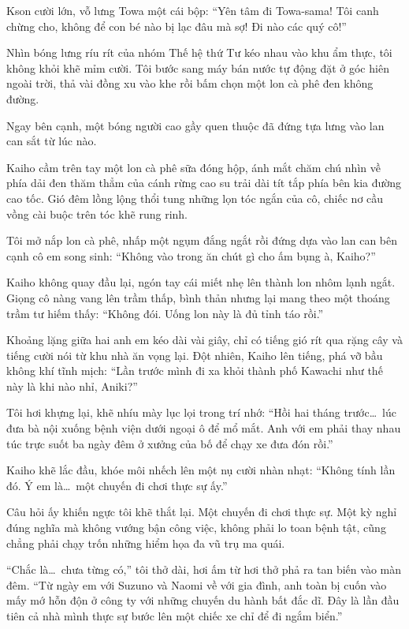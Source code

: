 \documentclass[../main.tex]{subfiles}
\begin{document}
Kson cười lớn, vỗ lưng Towa một cái bộp: ``Yên tâm đi Towa-sama! Tôi canh chừng cho, không để con bé nào bị lạc đâu mà sợ! Đi nào các quý cô!''

Nhìn bóng lưng ríu rít của nhóm Thế hệ thứ Tư kéo nhau vào khu ẩm thực, tôi không khỏi khẽ mỉm cười. Tôi bước sang máy bán nước tự động đặt ở góc hiên ngoài trời, thả vài đồng xu vào khe rồi bấm chọn một lon cà phê đen không đường.

Ngay bên cạnh, một bóng người cao gầy quen thuộc đã đứng tựa lưng vào lan can sắt từ lúc nào.

Kaiho cầm trên tay một lon cà phê sữa đóng hộp, ánh mắt chăm chú nhìn về phía dải đen thăm thẳm của cánh rừng cao su trải dài tít tắp phía bên kia đường cao tốc. Gió đêm lồng lộng thổi tung những lọn tóc ngắn của cô, chiếc nơ cầu vồng cài buộc trên tóc khẽ rung rinh.

Tôi mở nắp lon cà phê, nhấp một ngụm đắng ngắt rồi đứng dựa vào lan can bên cạnh cô em song sinh: ``Không vào trong ăn chút gì cho ấm bụng à, Kaiho?''

Kaiho không quay đầu lại, ngón tay cái miết nhẹ lên thành lon nhôm lạnh ngắt. Giọng cô nàng vang lên trầm thấp, bình thản nhưng lại mang theo một thoáng trầm tư hiếm thấy: ``Không đói. Uống lon này là đủ tỉnh táo rồi.''

Khoảng lặng giữa hai anh em kéo dài vài giây, chỉ có tiếng gió rít qua rặng cây và tiếng cười nói từ khu nhà ăn vọng lại. Đột nhiên, Kaiho lên tiếng, phá vỡ bầu không khí tĩnh mịch: ``Lần trước mình đi xa khỏi thành phố Kawachi như thế này là khi nào nhỉ, Aniki?''

Tôi hơi khựng lại, khẽ nhíu mày lục lọi trong trí nhớ: ``Hồi hai tháng trước\dots\ lúc đưa bà nội xuống bệnh viện dưới ngoại ô để mổ mắt. Anh với em phải thay nhau túc trực suốt ba ngày đêm ở xưởng của bố để chạy xe đưa đón rồi.''

Kaiho khẽ lắc đầu, khóe môi nhếch lên một nụ cười nhàn nhạt: ``Không tính lần đó. Ý em là\dots\ một chuyến đi chơi thực sự ấy.''

Câu hỏi ấy khiến ngực tôi khẽ thắt lại. Một chuyến đi chơi thực sự. Một kỳ nghỉ đúng nghĩa mà không vướng bận công việc, không phải lo toan bệnh tật, cũng chẳng phải chạy trốn những hiểm họa đa vũ trụ ma quái.

``Chắc là\dots\ chưa từng có,'' tôi thở dài, hơi ấm từ hơi thở phả ra tan biến vào màn đêm. ``Từ ngày em với Suzuno và Naomi về với gia đình, anh toàn bị cuốn vào mấy mớ hỗn độn ở công ty với những chuyến du hành bất đắc dĩ. Đây là lần đầu tiên cả nhà mình thực sự bước lên một chiếc xe chỉ để đi ngắm biển.''
\end{document}
